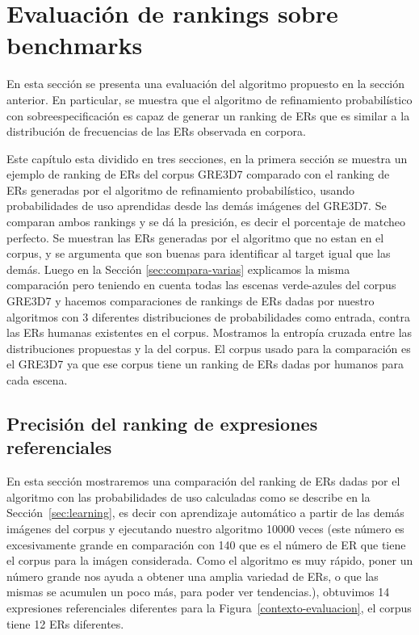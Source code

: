 \chapter{Evaluaci\'on de rankings sobre benchmarks}
\label{sec:evaluacion}

En esta secci\'on se presenta una evaluaci\'on del algoritmo propuesto en la secci\'on anterior. En particular, se muestra que el algoritmo de refinamiento probabil\'{i}stico con sobreespecificaci\'on es capaz de generar un ranking de ERs que es similar a la distribuci\'on de frecuencias de las ERs observada en corpora. 

Este cap\'itulo esta dividido en tres secciones, en la primera secci\'on se muestra un ejemplo de ranking de ERs del corpus GRE3D7 comparado con el ranking de ERs generadas por el algoritmo de refinamiento probabil\'istico, usando probabilidades de uso aprendidas desde las dem\'as im\'agenes del GRE3D7. Se comparan ambos rankings y se d\'a la presici\'on, es decir el porcentaje de matcheo perfecto. Se muestran las ERs generadas por el algoritmo que no estan en el corpus, y se argumenta que son buenas para identificar al target igual que las dem\'as. Luego en la Secci\'on \ref{sec:compara-varias} explicamos la misma comparaci\'on pero teniendo en cuenta todas las escenas verde-azules del corpus GRE3D7 y hacemos comparaciones de rankings de ERs dadas por nuestro algoritmos con 3 diferentes distribuciones de probabilidades como entrada, contra las ERs humanas existentes en el corpus. Mostramos la entrop\'ia cruzada entre las distribuciones propuestas y la del corpus. El corpus usado para la comparaci\'on es el GRE3D7 ya que ese corpus tiene un ranking de ERs dadas por humanos para cada escena.


\section{Precisi\'on del ranking de expresiones referenciales}
\label{sec:compara}

En esta secci\'on mostraremos una comparaci\'on del ranking de ERs dadas por el algoritmo con las probabilidades de uso calculadas como se describe en la Secci\'on~\ref{sec:learning}, es decir con aprendizaje autom\'atico a partir de las dem\'as im\'agenes del corpus y ejecutando nuestro algoritmo 10000 veces (este n\'umero es excesivamente grande en comparaci\'on con 140 que es el n\'umero de ER que tiene el corpus para la im\'agen considerada. Como el algoritmo es muy r\'apido, poner un n\'umero grande nos ayuda a obtener una amplia variedad de ERs, o que las mismas se acumulen un poco m\'as, para poder ver tendencias.), obtuvimos 14 expresiones referenciales diferentes para la Figura~\ref{contexto-evaluacion}, el corpus tiene 12 ERs diferentes.
 
